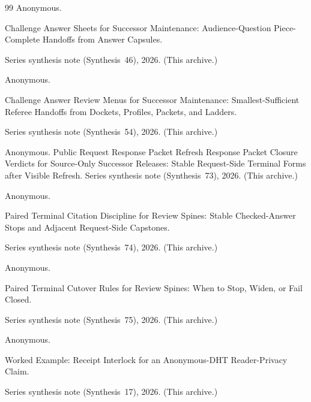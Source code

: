 \documentclass[11pt]{article}
\begin{document}
\begin{thebibliography}{99}
Anonymous.

\newblock Challenge Answer Sheets for Successor Maintenance: Audience-Question Piece-Complete Handoffs from Answer Capsules.

\newblock Series synthesis note (Synthesis~46), 2026. (This archive.)

Anonymous.

\newblock Challenge Answer Review Menus for Successor Maintenance: Smallest-Sufficient Referee Handoffs from Dockets, Profiles, Packets, and Ladders.

\newblock Series synthesis note (Synthesis~54), 2026. (This archive.)

Anonymous.
\newblock Public Request Response Packet Refresh Response Packet Closure Verdicts for Source-Only Successor Releases: Stable Request-Side Terminal Forms after Visible Refresh.
\newblock Series synthesis note (Synthesis~73), 2026. (This archive.)

Anonymous.

\newblock Paired Terminal Citation Discipline for Review Spines: Stable Checked-Answer Stops and Adjacent Request-Side Capstones.

\newblock Series synthesis note (Synthesis~74), 2026. (This archive.)

Anonymous.

\newblock Paired Terminal Cutover Rules for Review Spines: When to Stop, Widen, or Fail Closed.

\newblock Series synthesis note (Synthesis~75), 2026. (This archive.)

Anonymous.

\newblock Worked Example: Receipt Interlock for an Anonymous-DHT Reader-Privacy Claim.

\newblock Series synthesis note (Synthesis~17), 2026. (This archive.)

\end{thebibliography}
\end{document}
